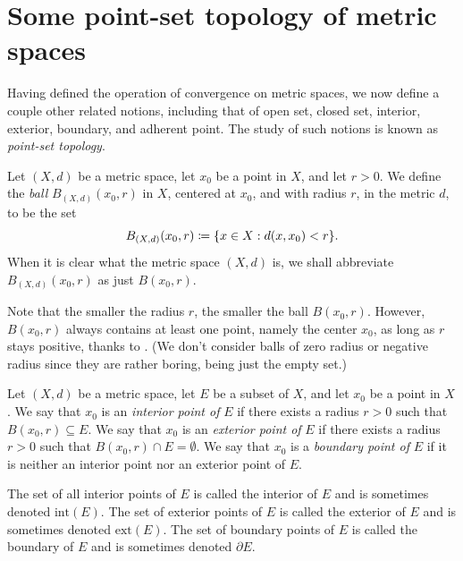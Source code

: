 \section{Some point-set topology of metric spaces}\label{ii:sec:1.2}

\begin{note}
  Having defined the operation of convergence on metric spaces, we now define a couple other related notions, including that of open set, closed set, interior, exterior, boundary, and adherent point.
  The study of such notions is known as \emph{point-set topology}.
\end{note}

\begin{defn}[Balls]\label{ii:1.2.1}
  Let \((X, d)\) be a metric space, let \(x_0\) be a point in \(X\), and let \(r > 0\).
  We define the \emph{ball} \(B_{(X, d)}(x_0, r)\) in \(X\), centered at \(x_0\), and with radius \(r\), in the metric \(d\), to be the set
  \[
    B_{(X, d)}(x_0, r) \coloneqq \set{x \in X : d(x, x_0) < r}.
  \]
  When it is clear what the metric space \((X, d)\) is, we shall abbreviate \(B_{(X, d)}(x_0, r)\) as just \(B(x_0, r)\).
\end{defn}

\setcounter{thm}{3}
\begin{rmk}\label{ii:1.2.4}
  Note that the smaller the radius \(r\), the smaller the ball \(B(x_0 , r)\).
  However, \(B(x_0 , r)\) always contains at least one point, namely the center \(x_0\), as long as \(r\) stays positive, thanks to .
  (We don't consider balls of zero radius or negative radius since they are rather boring, being just the empty set.)
\end{rmk}

\begin{defn}\label{ii:1.2.5}
  Let \((X, d)\) be a metric space, let \(E\) be a subset of \(X\), and let \(x_0\) be a point in \(X\).
  We say that \(x_0\) is an \emph{interior point of} \(E\) if there exists a radius \(r > 0\) such that \(B(x_0, r) \subseteq E\).
  We say that \(x_0\) is an \emph{exterior point of} \(E\) if there exists a radius \(r > 0\) such that \(B(x_0, r) \cap E = \emptyset\).
  We say that \(x_0\) is a \emph{boundary point of} \(E\) if it is neither an interior point nor an exterior point of \(E\).
\end{defn}

\begin{note}
  The set of all interior points of \(E\) is called the interior of \(E\) and is sometimes denoted \(\text{int}(E)\).
  The set of exterior points of \(E\) is called the exterior of \(E\) and is sometimes denoted \(\text{ext}(E)\).
  The set of boundary points of \(E\) is called the boundary of \(E\) and is sometimes denoted \(\partial E\).
\end{note}

